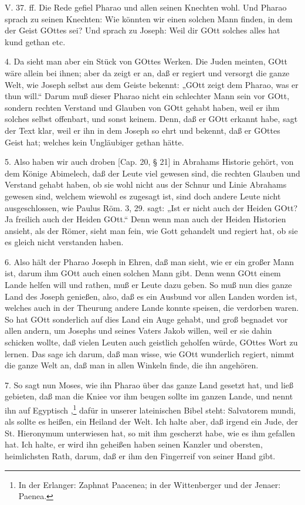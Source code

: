 \begin{schriftzitat}
V. 37. ff. Die Rede gefiel Pharao und allen seinen Knechten wohl. Und Pharao sprach zu seinen Knechten: Wie könnten wir einen solchen Mann finden, in dem der Geist GOttes sei? Und sprach zu Joseph: Weil dir GOtt solches alles hat kund gethan etc.
\end{schriftzitat}

4. Da sieht man aber ein Stück von GOttes Werken. Die Juden meinten, GOtt wäre allein bei ihnen; aber da zeigt er an, daß er regiert und versorgt die ganze Welt, wie Joseph selbst aus dem Geiste bekennt: „GOtt zeigt dem Pharao, was er thun will.“ Darum muß dieser Pharao nicht ein schlechter Mann sein vor GOtt, sondern rechten Verstand und Glauben von GOtt gehabt haben, weil er ihm solches selbst offenbart, und sonst keinem. Denn, daß er GOtt erkannt habe, sagt der Text klar, weil er ihn in dem Joseph so ehrt und bekennt, daß er GOttes Geist hat; welches kein Ungläubiger gethan hätte.

5. Also haben wir auch droben [Cap. 20, § 21] in Abrahams Historie gehört, von dem Könige Abimelech, daß der Leute viel gewesen sind, die rechten Glauben und Verstand gehabt haben, ob sie wohl nicht aus der Schnur und Linie Abrahams gewesen sind, welchem wiewohl es zugesagt ist, sind doch andere Leute nicht ausgeschlossen, wie Paulus Röm. 3, 29. sagt: „Ist er nicht auch der Heiden GOtt? Ja freilich auch der Heiden GOtt.“ Denn wenn man auch der Heiden Historien ansieht, als der Römer, sieht man fein, wie Gott gehandelt und regiert hat, ob sie es gleich nicht verstanden haben.

6. Also hält der Pharao Joseph in Ehren, daß man sieht, wie er ein großer Mann ist, darum ihm GOtt auch einen solchen Mann gibt. Denn wenn GOtt einem Lande helfen will und rathen, muß er Leute dazu geben. So muß nun dies ganze Land des Joseph genießen, also, daß es ein Ausbund vor allen Landen worden ist, welches auch in der Theurung andere Lande konnte speisen, die verdorben waren. So hat GOtt sonderlich auf dies Land ein Auge gehabt, und groß begnadet vor allen andern, um Josephs und seines Vaters Jakob willen, weil er sie dahin schicken wollte, daß vielen Leuten auch geistlich geholfen würde, GOttes Wort zu lernen. Das sage ich darum, daß man wisse, wie GOtt wunderlich regiert, nimmt die ganze Welt an, daß man in allen Winkeln finde, die ihn angehören.

7. So sagt nun Moses, wie ihn Pharao über das ganze Land gesetzt hat, und ließ gebieten, daß man die Kniee vor ihm beugen sollte im ganzen Lande, und nennt ihn auf Egyptisch ,\footnote{In der Erlanger: Zaphnat Paacenea; in der Wittenberger und der Jenaer: Paenea.} dafür in unserer lateinischen Bibel steht: Salvatorem mundi, als sollte es heißen, ein Heiland der Welt. Ich halte aber, daß irgend ein Jude, der St. Hieronymum unterwiesen hat, so mit ihm gescherzt habe, wie es ihm gefallen hat. Ich halte, er wird ihn geheißen haben seinen Kanzler und obersten, heimlichsten Rath, darum, daß er ihm den Fingerreif von seiner Hand gibt.

